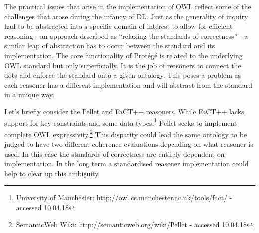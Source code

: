 \documentclass[titlepage,a4paper,12pt,oneside]{book}
\begin{document}
The practical issues that arise in the implementation of OWL reflect some of the challenges that arose during the infancy of DL.
Just as the generality of inquiry had to be abstracted into a specific domain of interest to allow for efficient reasoning - an approach described as ``relaxing the standards of correctness'' \cite[81]{expressiveness1987} - a similar leap of abstraction has to occur between the standard and its implementation.
The core functionality of Protégé is related to the underlying OWL standard but only superficially.
It is the job of reasoners to connect the dots and enforce the standard onto a given ontology.
This poses a problem as each reasoner has a different implementation and will abstract from the standard in a unique way.\par
Let's briefly consider the Pellet and FaCT++ reasoners.
While FaCT++ lacks support for key constraints and some data-types,\footnote{University of Manchester: http://owl.cs.manchester.ac.uk/tools/fact/ - accessed 10.04.18} Pellet seeks to implement complete OWL expressivity.\footnote{SemanticWeb Wiki: http://semanticweb.org/wiki/Pellet - accessed 10.04.18}
This disparity could lead the same ontology to be judged to have two different coherence evaluations depending on what reasoner is used.
In this case the standards of correctness are entirely dependent on implementation.
In the long term a standardised reasoner implementation could help to clear up this ambiguity.
\end{document}

